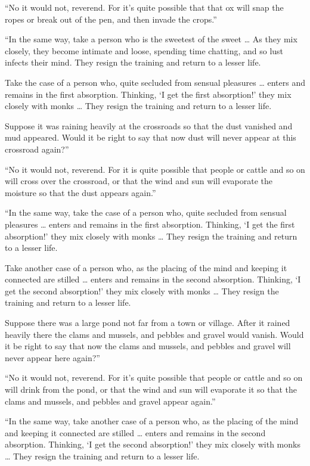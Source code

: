 \documentclass[12pt,openany]{book}%
\begin{document}
“No it would not, reverend. For it’s quite possible that that ox will snap the ropes or break out of the pen, and then invade the crops.” 

“In the same way, take a person who is the sweetest of the sweet … As they mix closely, they become intimate and loose, spending time chatting, and so lust infects their mind. They resign the training and return to a lesser life. 

Take the case of a person who, quite secluded from sensual pleasures … enters and remains in the first absorption. Thinking, ‘I get the first absorption!’ they mix closely with monks … They resign the training and return to a lesser life. 

Suppose it was raining heavily at the crossroads so that the dust vanished and mud appeared. Would it be right to say that now dust will never appear at this crossroad again?” 

“No it would not, reverend. For it is quite possible that people or cattle and so on will cross over the crossroad, or that the wind and sun will evaporate the moisture so that the dust appears again.” 

“In the same way, take the case of a person who, quite secluded from sensual pleasures … enters and remains in the first absorption. Thinking, ‘I get the first absorption!’ they mix closely with monks … They resign the training and return to a lesser life. 

Take another case of a person who, as the placing of the mind and keeping it connected are stilled … enters and remains in the second absorption. Thinking, ‘I get the second absorption!’ they mix closely with monks … They resign the training and return to a lesser life. 

Suppose there was a large pond not far from a town or village. After it rained heavily there the clams and mussels, and pebbles and gravel would vanish. Would it be right to say that now the clams and mussels, and pebbles and gravel will never appear here again?” 

“No it would not, reverend. For it’s quite possible that people or cattle and so on will drink from the pond, or that the wind and sun will evaporate it so that the clams and mussels, and pebbles and gravel appear again.” 

“In the same way, take another case of a person who, as the placing of the mind and keeping it connected are stilled … enters and remains in the second absorption. Thinking, ‘I get the second absorption!’ they mix closely with monks … They resign the training and return to a lesser life. 
\end{document}
